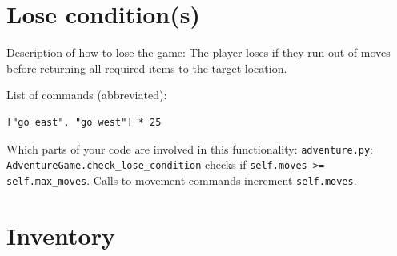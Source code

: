 \documentclass[11pt]{article}
\begin{document}
\section*{Lose condition(s)}
Description of how to lose the game:
The player loses if they run out of moves before returning all required items to the target location.

List of commands (abbreviated):
\begin{verbatim}
["go east", "go west"] * 25
\end{verbatim}

Which parts of your code are involved in this functionality:
\texttt{adventure.py}: \texttt{AdventureGame.check\_lose\_condition} checks if \texttt{self.moves >= self.max\_moves}. Calls to movement commands increment \texttt{self.moves}.

\section*{Inventory}
\end{document}
